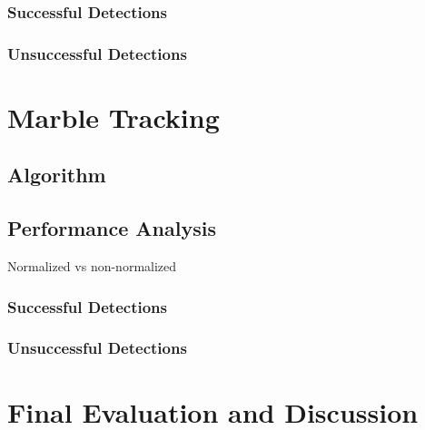 \documentclass[10pt,a4paper,twocolumn]{report}
\begin{document}
\subsection{Successful Detections}

\subsection{Unsuccessful Detections}

\chapter{Marble Tracking}

\section{Algorithm}

\section{Performance Analysis}

Normalized vs non-normalized

\subsection{Successful Detections}

\subsection{Unsuccessful Detections}

\chapter{Final Evaluation and Discussion}
\end{document}
